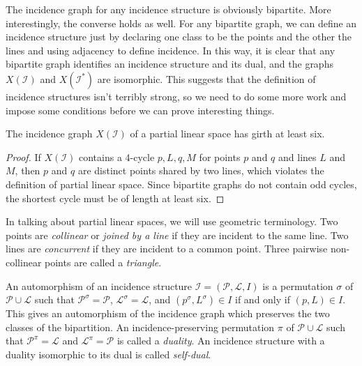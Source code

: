 The incidence graph for any incidence structure is obviously bipartite.  More interestingly, the converse holds as well.  For any bipartite graph, we can define an incidence structure just by declaring one class to be the points and the other the lines and using adjacency to define incidence.  In this way, it is clear that any bipartite graph identifies an incidence structure and its dual, and the graphs $X(\mathcal{I})$ and $X(\mathcal{I}^*)$ are isomorphic.  This suggests that the definition of incidence structures isn't terribly strong, so we need to do some more work and impose some conditions before we can prove interesting things.


\begin{lemma}
	The incidence graph $X(\mathcal{I})$ of a partial linear space has girth at least six.

\end{lemma}
\begin{proof}
	If $X(\mathcal{I})$ contains a 4-cycle $p,L,q,M$ for points $p$ and $q$ and lines $L$ and $M$, then $p$ and $q$ are distinct points shared by two lines, which violates the definition of partial linear space.  Since bipartite graphs do not contain odd cycles, the shortest cycle must be of length at least six.
\end{proof}	

In talking about partial linear spaces, we will use geometric terminology. Two points are \textit{collinear} or \textit{joined by a line} if they are incident to the same line.  Two lines are \textit{concurrent} if they are incident to a common point.  Three pairwise non-collinear points are called a \textit{triangle}.


An automorphism of an incidence structure $\mathcal{I}=(\mathcal{P},\mathcal{L},I)$ is a permutation $\sigma$ of $\mathcal{P}\cup\mathcal{L}$ such that $\mathcal{P}^\sigma = \mathcal{P}$, $\mathcal{L}^\sigma = \mathcal{L}$, and $(p^\sigma,L^\sigma)\in I$ if and only if $(p,L)\in I$.  This gives an automorphism of the incidence graph which preserves the two classes of the bipartition.  An incidence-preserving permutation $\pi$ of $\mathcal{P}\cup\mathcal{L}$ such that $\mathcal{P}^\pi = \mathcal{L}$ and $\mathcal{L}^\pi = \mathcal{P}$ is called a \textit{duality}.  An incidence structure with a duality isomorphic to its dual is called \textit{self-dual}.
	
